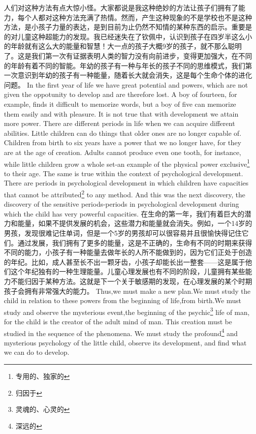 \documentclass[lang=cn,10pt]{elegantbook}
\begin{document}
人们对这种方法有点大惊小怪。大家都说是我这种绝妙的方法让孩子们拥有了能力，每个人都对这种方法充满了热情。然而，产生这种现象的不是学校也不是这种方法，是小孩子力量的表达，是到目前为止仍然不知情的某种东西的启示。重要是的对儿童这种超能力的发现。我已经迷失在了钦佩中，认识到孩子在四岁半这么小的年龄就有这么大的能量和智慧！大一点的孩子大概9岁的孩子，就不那么聪明了。这是我们第一次有证据表明人类的智力没有向前进步，变得更加强大，在不同的年龄有着不同的智能。年幼的孩子有一种与年长的孩子不同的思维模式，我们第一次意识到年幼的孩子有一种能量，随着长大就会消失，这是每个生命个体的进化问题。
In the first year of life we have great potential and powers, which are not given the oppotunity to develop and are therefore lost. A boy of fourteen, for example, finds it difficult to memorize words, but a boy of five can memorize them easily and with pleasure. It is not true that with development we attain more power. There are different periods in life when we can acquire different abilities. Little children can do things that older ones are no longer capable of. Children from birth to six years have a power that we no longer have, for they are at the age of creation. Adults cannot produce even one tooth, for instance, while little children grow a whole set-an example of the physical power exclusive\footnote{专用的、独家的} to their age. The same is true within the context of psychological development. There are periods in psychological development in which children have capacities that cannot be attributed\footnote{归因于} to any method. And this was the next discovery, the discovery of the sensitive periods-periods in psychological development during which the child has very powerful capacities.
在生命的第一年，我们有着巨大的潜力和能量，如果不提供发展的机会，这些潜力和能量就会消失。例如，一个14岁的男孩，发现很难记住单词，但是一个5岁的男孩却可以很容易并且很愉快得记住它们。通过发展，我们拥有了更多的能量，这是不正确的，生命有不同的时期来获得不同的能力，小孩子有一种能量去做年长的人所不能做到的，因为它们正处于创造的年纪。比如，成人甚至长不出一颗牙齿，小孩子却能长出一整套——这是属于他们这个年纪独有的一种生理能量。儿童心理发展也有不同的阶段，儿童拥有某些能力不能归因于某种方法。这就是下一个关于敏感期的发现，在心理发展的某个时期孩子会拥有非常强大的能力。
Thus,we must make a new plan.We must study the child in relation to these powers from the beginning of life,from birth.We must study and observe the mysterious event,the beginning of the psychic\footnote{灵魂的、心灵的} life of man, for the child is the creator of the adult mind of man. This creation must be studied in the sequence of the phenomena. We must study the profound\footnote{深远的} and mysterious psychology of the little child, observe its development, and find what we can do to develop.
\end{document}
